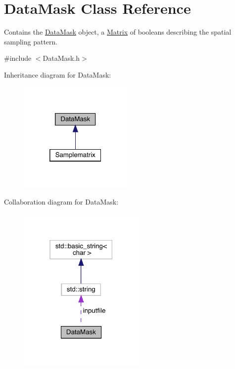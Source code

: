 \hypertarget{class_data_mask}{}\section{Data\+Mask Class Reference}
\label{class_data_mask}


Contains the \hyperlink{class_data_mask}{Data\+Mask} object, a \hyperlink{class_matrix}{Matrix} of booleans describing the spatial sampling pattern.  




{\ttfamily \#include $<$Data\+Mask.\+h$>$}



Inheritance diagram for Data\+Mask\+:\nopagebreak
\begin{figure}[H]
\begin{center}
\leavevmode
\includegraphics[width=157pt]{class_data_mask__inherit__graph}
\end{center}
\end{figure}


Collaboration diagram for Data\+Mask\+:\nopagebreak
\begin{figure}[H]
\begin{center}
\leavevmode
\includegraphics[width=174pt]{class_data_mask__coll__graph}
\end{center}
\end{figure}
